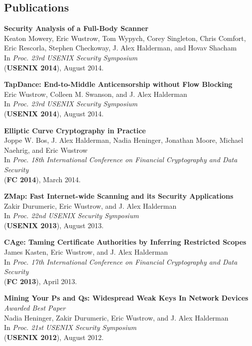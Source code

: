 \documentclass{res}
\begin{document}
\begin{resume}
\section{Publications}

    \textbf{Security Analysis of a Full-Body Scanner} \\
    Keaton Mowery, Eric Wustrow, Tom Wypych, Corey Singleton, Chris Comfort, Eric Rescorla, Stephen Checkoway, J. Alex Halderman, and Hovav Shacham \\
    In \emph{Proc. 23rd USENIX Security Symposium} \\
    (\textbf{USENIX 2014}), August 2014.

    \textbf{TapDance: End-to-Middle Anticensorship without Flow Blocking} \\
    Eric Wustrow, Colleen M. Swanson, and J. Alex Halderman \\
    In \emph{Proc. 23rd USENIX Security Symposium} \\
    (\textbf{USENIX 2014}), August 2014.

    \textbf{Elliptic Curve Cryptography in Practice} \\
    Joppe W. Bos, J. Alex Halderman, Nadia Heninger, Jonathan Moore, Michael Naehrig, and Eric Wustrow \\
    In \emph{Proc. 18th International Conference on Financial Cryptography and Data Security} \\
    (\textbf{FC 2014}), March 2014.

    \textbf{ZMap: Fast Internet-wide Scanning and its Security Applications} \\
    Zakir Durumeric, Eric Wustrow, and J. Alex Halderman \\
    In \emph{Proc. 22nd USENIX Security Symposium} \\
    (\textbf{USENIX 2013}), August 2013.

    \textbf{CAge: Taming Certificate Authorities by Inferring Restricted Scopes} \\
    James Kasten, Eric Wustrow, and J. Alex Halderman \\
    In \emph{Proc. 17th International Conference on Financial Cryptography and Data Security} \\
    (\textbf{FC 2013}), April 2013.

    \textbf{Mining Your Ps and Qs: Widespread Weak Keys In Network Devices} \\
    \emph{Awarded Best Paper} \\
    Nadia Heninger, Zakir Durumeric, Eric Wustrow, and J. Alex Halderman \\
    In \emph{Proc. 21st USENIX Security Symposium} \\
    (\textbf{USENIX 2012}), August 2012.


\end{resume}
\end{document}
